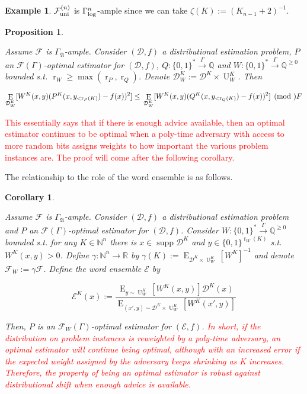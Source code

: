 \documentclass[11pt]{article}
\numberwithin{equation}{section}
\theoremstyle{definition}
\newtheorem{example}{Example}[section]
\theoremstyle{plain}
\newtheorem{proposition}{Proposition}[section]
\newtheorem{corollary}{Corollary}[section]
\newcommand{\Bool}{\{0,1\}}
\newcommand{\Words}{{\Bool^*}}
\newcommand{\WordsLen}[1]{{\Bool^{#1}}}
\DeclareMathOperator{\Supp}{supp}
\DeclareMathOperator{\E}{E}
\DeclareMathOperator{\R}{r}
\DeclareMathOperator{\Un}{U}
\newcommand{\Nats}{\mathbb{N}}
\newcommand{\Rats}{\mathbb{Q}}
\newcommand{\Reals}{\mathbb{R}}
\newcommand{\NatFun}{\Nats^n \rightarrow}
\newcommand{\Dist}{\mathcal{D}}
\newcommand{\GrowA}{\Gamma_{\mathfrak{A}}}
\newcommand{\Fall}{\mathcal{F}}
\newcommand{\EG}{\Fall(\Gamma)}
\newcommand{\GammaLog}{\Gamma_{\textnormal{log}}}
\newcommand{\FallU}{{\Fall_{\textnormal{uni}}^{(n)}}}
\newcommand{\Scheme}{\xrightarrow{\Gamma}}
\begin{document}
\begin{samepage}
\begin{example}

${\FallU}$ is ${\GammaLog^n}$-ample since we can take ${\zeta(K):=(K_{n-1}+2)^{-1}}$.

\end{example}
\end{samepage}

\begin{proposition}
\label{prp:weight}

Assume $\Fall$ is $\GrowA$-ample. Consider $(\Dist,f)$ a distributional estimation problem, $P$ an $\EG$-optimal estimator for $(\Dist,f)$, $Q: \Words \Scheme \Rats$ and ${W: \Words \Scheme \Rats^{\geq 0}}$ bounded s.t. ${\R_W \geq \max(\R_P, \R_Q)}$. Denote ${\Dist_W^K:=\Dist^K \times \Un_W^K}$. Then

\begin{equation}
\E_{\Dist_W^{K}}[W^{K}(x,y)(P^{K}(x,y_{<\R_P(K)}) - f(x))^2] \leq \\ \E_{\Dist_W^{K}}[W^{K}(x,y)(Q^{K}(x,y_{<\R_Q(K)}) - f(x))^2] \pmod \Fall
\end{equation}

\end{proposition}

\textcolor{red}{This essentially says that if there is enough advice available, then an optimal estimator continues to be optimal when a poly-time adversary with access to more random bits assigns weights to how important the various problem instances are. The proof will come after the following corollary.}

The relationship to the role of the word ensemble is as follows.

\begin{samepage}
\begin{corollary}
\label{crl:weight}

Assume $\Fall$ is $\GrowA$-ample. Consider $(\Dist,f)$ a distributional estimation problem and $P$ an $\EG$-optimal estimator for $(\Dist,f)$. Consider ${W: \Words \Scheme \Rats^{\geq 0}}$ bounded s.t. for any $K \in \Nats^n$ there is $x \in \Supp \Dist^K$ and $y \in \WordsLen{\R_W(K)}$ s.t. $W^K(x,y) > 0$. Define ${\gamma: \NatFun \Reals}$ by ${\gamma(K):=\E_{\Dist^K \times \Un_W^K}[W^K]^{-1}}$ and denote ${\Fall_W:= \gamma\Fall}$. Define the word ensemble $\mathcal{E}$ by 

\[\mathcal{E}^K(x):=\frac{\E_{y \sim \Un_W^K}[W^K(x,y)] \Dist^K(x)}{\E_{(x',y) \sim \Dist^K \times \Un_W^K}[W^K(x',y)]}\]

Then, $P$ is an $\Fall_W(\Gamma)$-optimal estimator for $(\mathcal{E},f)$.
\textcolor{red}{In short, if the distribution on problem instances is reweighted by a poly-time adversary, an optimal estimator will continue being optimal, although with an increased error if the expected weight assigned by the adversary keeps shrinking as K increases. Therefore, the property of being an optimal estimator is robust against distributional shift when enough advice is available.}
\end{corollary}
\end{samepage}
\end{document}

